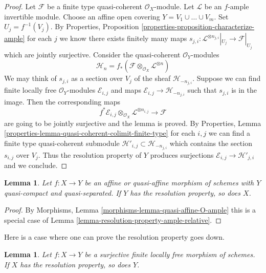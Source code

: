 \documentclass{stacks-project}
\theoremstyle{plain}
\newtheorem{lemma}[subsection]{Lemma}
\theoremstyle{definition}
\theoremstyle{remark}
\numberwithin{equation}{subsection}
\begin{document}
\begin{proof}
Let $\mathcal{F}$ be a finite type quasi-coherent $\mathcal{O}_X$-module.
Let $\mathcal{L}$ be an $f$-ample invertible module.
Choose an affine open covering $Y = V_1 \cup \ldots \cup V_m$.
Set $U_j = f^{-1}(V_j)$. By Properties, Proposition
\ref{properties-proposition-characterize-ample}
for each $j$ we know there exists finitely many maps
$s_{j, i} : \mathcal{L}^{\otimes n_{j, i}}|_{U_j} \to \mathcal{F}|_{U_j}$
which are jointly surjective. Consider the quasi-coherent
$\mathcal{O}_Y$-modules
$$
\mathcal{H}_n =
f_*(\mathcal{F} \otimes_{\mathcal{O}_X} \mathcal{L}^{\otimes n})
$$
We may think of $s_{j, i}$ as a section over $V_j$ of the sheaf
$\mathcal{H}_{-n_{j, i}}$. Suppose we can find finite locally
free $\mathcal{O}_Y$-modules $\mathcal{E}_{i, j}$ and maps
$\mathcal{E}_{i, j} \to \mathcal{H}_{-n_{j, i}}$ such that
$s_{j, i}$ is in the image. Then the corresponding maps
$$
f^*\mathcal{E}_{i, j}
\otimes_{\mathcal{O}_X}
\mathcal{L}^{\otimes n_{i, j}} \longrightarrow \mathcal{F}
$$
are going to be jointly surjective and the lemma is proved. By
Properties, Lemma \ref{properties-lemma-quasi-coherent-colimit-finite-type}
for each $i, j$ we can find a finite
type quasi-coherent submodule
$\mathcal{H}'_{i, j} \subset  \mathcal{H}_{-n_{j, i}}$
which contains the section $s_{i, j}$ over $V_j$.
Thus the resolution property of $Y$ produces surjections
$\mathcal{E}_{i, j} \to \mathcal{H}'_{j, i}$ and we conclude.
\end{proof}

\begin{lemma}
\label{lemma-resolution-property-goes-up-affine}
Let $f : X \to Y$ be an affine or quasi-affine morphism of schemes with
$Y$ quasi-compact and quasi-separated.
If $Y$ has the resolution property, so does $X$.
\end{lemma}

\begin{proof}
By Morphisms, Lemma \ref{morphisms-lemma-quasi-affine-O-ample}
this is a special case of
Lemma \ref{lemma-resolution-property-ample-relative}.
\end{proof}

\noindent
Here is a case where one can prove the resolution property goes down.

\begin{lemma}
\label{lemma-resolution-property-goes-down-finite-flat}
Let $f : X \to Y$ be a surjective finite locally free morphism of schemes.
If $X$ has the resolution property, so does $Y$.
\end{lemma}
\end{document}
